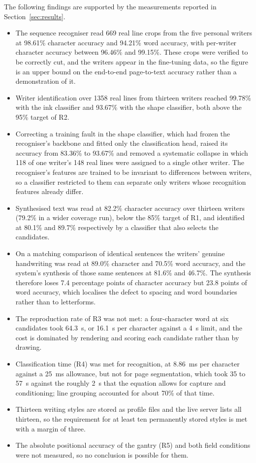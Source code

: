 The following findings are supported by the measurements reported in Section~\ref{sec:results}.
\begin{itemize}
  \item The sequence recogniser read 669 real line crops from the five personal writers at 98.61\% character accuracy and 94.21\% word accuracy, with per-writer character accuracy between 96.46\% and 99.15\%. These crops were verified to be correctly cut, and the writers appear in the fine-tuning data, so the figure is an upper bound on the end-to-end page-to-text accuracy rather than a demonstration of it.
  \item Writer identification over 1358 real lines from thirteen writers reached 99.78\% with the ink classifier and 93.67\% with the shape classifier, both above the 95\% target of R2.
  \item Correcting a training fault in the shape classifier, which had frozen the recogniser's backbone and fitted only the classification head, raised its accuracy from 83.36\% to 93.67\% and removed a systematic collapse in which 118 of one writer's 148 real lines were assigned to a single other writer. The recogniser's features are trained to be invariant to differences between writers, so a classifier restricted to them can separate only writers whose recognition features already differ.
  \item Synthesised text was read at 82.2\% character accuracy over thirteen writers (79.2\% in a wider coverage run), below the 85\% target of R1, and identified at 80.1\% and 89.7\% respectively by a classifier that also selects the candidates.
  \item On a matching comparison of identical sentences the writers' genuine handwriting was read at 89.0\% character and 70.5\% word accuracy, and the system's synthesis of those same sentences at 81.6\% and 46.7\%. The synthesis therefore loses 7.4 percentage points of character accuracy but 23.8 points of word accuracy, which localises the defect to spacing and word boundaries rather than to letterforms.
  \item The reproduction rate of R3 was not met: a four-character word at six candidates took 64.3~s, or 16.1~s per character against a 4~s limit, and the cost is dominated by rendering and scoring each candidate rather than by drawing.
  \item Classification time (R4) was met for recognition, at 8.86~ms per character against a 25~ms allowance, but not for page segmentation, which took 35 to 57~s against the roughly 2~s that the equation allows for capture and conditioning; line grouping accounted for about 70\% of that time.
  \item Thirteen writing styles are stored as profile files and the live server lists all thirteen, so the requirement for at least ten permanently stored styles is met with a margin of three.
  \item The absolute positional accuracy of the gantry (R5) and both field conditions were not measured, so no conclusion is possible for them.
\end{itemize}
